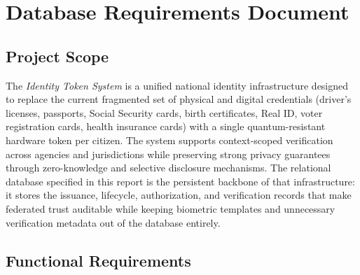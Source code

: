 \documentclass[11pt,letterpaper]{article}
\begin{document}
\section{Database Requirements Document}
\label{sec:db-requirements}

\subsection{Project Scope}
The \textit{Identity Token System} is a unified national identity infrastructure designed to replace the current fragmented set of physical and digital credentials (driver's licenses, passports, Social Security cards, birth certificates, Real ID, voter registration cards, health insurance cards) with a single quantum-resistant hardware token per citizen. The system supports context-scoped verification across agencies and jurisdictions while preserving strong privacy guarantees through zero-knowledge and selective disclosure mechanisms. The relational database specified in this report is the persistent backbone of that infrastructure: it stores the issuance, lifecycle, authorization, and verification records that make federated trust auditable while keeping biometric templates and unnecessary verification metadata out of the database entirely.

\subsection{Functional Requirements}
\end{document}
